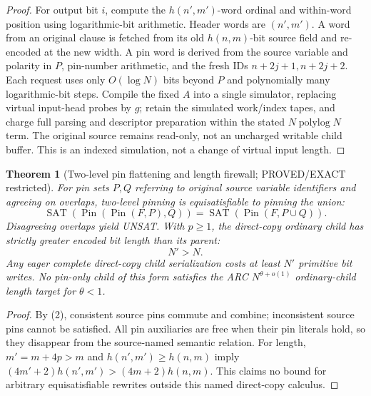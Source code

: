 \documentclass[11pt]{article}
\newtheorem{theorem}{Theorem}
\begin{document}
\begin{proof}
For output bit $i$, compute the $h(n',m')$-word ordinal and within-word position using logarithmic-bit arithmetic. Header words are $(n',m')$. A word from an original clause is fetched from its old $h(n,m)$-bit source field and re-encoded at the new width. A pin word is derived from the source variable and polarity in $P$, pin-number arithmetic, and the fresh IDs $n+2j+1,n+2j+2$. Each request uses only $O(\log N)$ bits beyond $P$ and polynomially many logarithmic-bit steps. Compile the fixed $A$ into a single simulator, replacing virtual input-head probes by $g$; retain the simulated work/index tapes, and charge full parsing and descriptor preparation within the stated $N\operatorname{polylog}N$ term. The original source remains read-only, not an uncharged writable child buffer. This is an indexed simulation, not a change of virtual input length.
\end{proof}
\begin{theorem}[Two-level pin flattening and length firewall; PROVED/EXACT restricted]
For pin sets $P,Q$ referring to \emph{original source variable identifiers} and agreeing on overlaps, two-level pinning is equisatisfiable to pinning the union:
\[
 \operatorname{SAT}(\operatorname{Pin}(\operatorname{Pin}(F,P),Q))
 =\operatorname{SAT}(\operatorname{Pin}(F,P\cup Q)).
 \tag{4}
\]
Disagreeing overlaps yield UNSAT. With $p\ge1$, the direct-copy ordinary child has strictly greater encoded bit length than its parent:
\[
 \boxed{N'>N}.
 \tag{5}
\]
Any eager complete direct-copy child serialization costs at least $N'$ primitive bit writes. No pin-only child of this form satisfies the ARC $N^{\theta+o(1)}$ ordinary-child length target for $\theta<1$.
\end{theorem}
\begin{proof}
By (2), consistent source pins commute and combine; inconsistent source pins cannot be satisfied. All pin auxiliaries are free when their pin literals hold, so they disappear from the source-named semantic relation. For length, $m'=m+4p>m$ and $h(n',m')\ge h(n,m)$ imply $(4m'+2)h(n',m')>(4m+2)h(n,m)$. This claims no bound for arbitrary equisatisfiable rewrites outside this named direct-copy calculus.
\end{proof}
\end{document}
